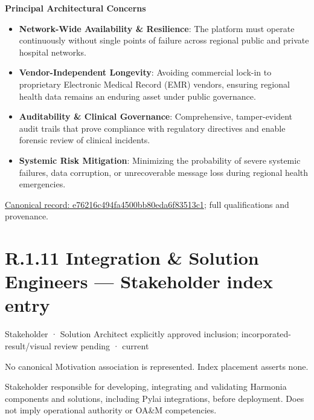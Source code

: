 \par\medskip\textbf{Principal Architectural Concerns}\par


\begin{itemize}


\item \textbf{Network-Wide Availability \& Resilience}: The platform must operate continuously without single points of failure across regional public and private hospital networks.

\item \textbf{Vendor-Independent Longevity}: Avoiding commercial lock-in to proprietary Electronic Medical Record (EMR) vendors, ensuring regional health data remains an enduring asset under public governance.

\item \textbf{Auditability \& Clinical Governance}: Comprehensive, tamper-evident audit trails that prove compliance with regulatory directives and enable forensic review of clinical incidents.

\item \textbf{Systemic Risk Mitigation}: Minimizing the probability of severe systemic failures, data corruption, or unrecoverable message loss during regional health emergencies.

\end{itemize}

{\footnotesize \href{../../../../continuum/motivation/stakeholder/e76216c494fa4500bb80eda6f83513c1.md}{Canonical record: e76216c494fa4500bb80eda6f83513c1}; full qualifications and provenance.}\par
\section*{R.1.11 Integration \& Solution Engineers — Stakeholder index entry}
\label{navigation:R.1.11}

\label{element:1dc29678ec4a4a498620c84ffa03c2bb}
{\small Stakeholder · Solution Architect explicitly approved inclusion; incorporated-result/visual review pending · current}\par
No canonical Motivation association is represented. Index placement asserts none.\par

Stakeholder responsible for developing, integrating and validating Harmonia components and solutions, including Pylai integrations, before deployment. Does not imply operational authority or OA\&M competencies.



